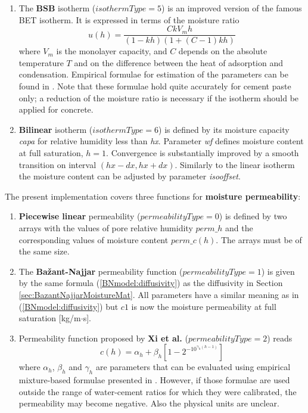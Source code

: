 \documentclass[a4paper]{article}
\begin{document}
\begin{enumerate}
\item
The {\bf BSB} isotherm \cite{BSB} ($isothermType=5$) is an improved
version of the famous BET isotherm. It is expressed in terms
of the moisture ratio
\begin{equation}\label{nlisomoisture:BSB}
u(h) = \frac{C k V_m h}{(1-k h)(1+(C-1)k h)}
\end{equation} 
where $V_m$ is the monolayer capacity, and $C$ depends on the absolute
temperature $T$ and on the difference between the heat of adsorption and
condensation. Empirical formulae for estimation of the parameters can
be found in \cite{Xi}. Note that these formulae hold quite accurately
for cement paste only; a reduction of the moisture ratio is necessary 
if the isotherm
should be applied for concrete.

\item
{\bf Bilinear} isotherm ($isothermType=6$) is defined by its
moisture capacity \emph{capa} for relative humidity less than
\emph{hx}. Parameter \emph{wf} defines moisture content at full
saturation, $h = 1$. Convergence is substantially improved by a smooth transition on
interval $(hx-dx, hx+dx)$.
Similarly to the linear isotherm the moisture content can be
adjusted by parameter \emph{isooffset}. 


\end{enumerate}

The present implementation covers three functions for 
{\bf moisture permeability}:
\begin{enumerate}

\item
{\bf Piecewise linear} permeability  ($permeabilityType=0$) 
is defined by two arrays
with the values of pore relative humidity $perm\_h$ and the
corresponding values of moisture content $perm\_c(h)$. The arrays must be of
the same size. 

\item
The {\bf Ba\v{z}ant-Najjar} 
permeability function ($permeabilityType=1$) is given by the same
formula (\ref{BNmodel:diffusivity}) as the diffusivity in 
Section \ref{sec:BazantNajjarMoistureMat}. All parameters have a similar
meaning as in (\ref{BNmodel:diffusivity}) but  $c1$ is now the
moisture permeability at full saturation [kg/m$\cdot$s].

\item
Permeability function proposed by {\bf Xi et al.} \cite{Xi}
($permeabilityType=2$) reads
\begin{equation}\label{nlisomoisture:Xi}
c(h) = \alpha_h + \beta_h \left[ 1 - 2^{-10^{\gamma_h(h-1)}} \right]
\end{equation} 
where $\alpha_h$, $\beta_h$ and $\gamma_h$ are parameters that can be
evaluated using empirical mixture-based formulae presented in \cite{Xi}. 
However, if those formulae are used outside the range of water-cement 
ratios for which they were calibrated, the
permeability may become negative. Also the physical units are unclear.
\end{enumerate}
\end{document}

